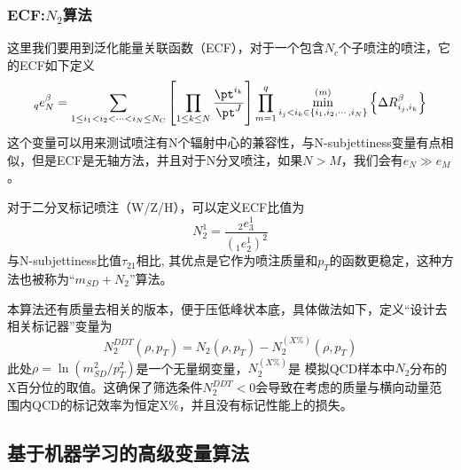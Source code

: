 \subsubsection{ECF:$N_2$算法}
这里我们要用到泛化能量关联函数（ECF），对于一个包含$N_c$个子喷注的喷注，它的ECF如下定义
\begin{equation}
    {}_{q}e_{N}^{\beta}=\sum_{1\leq i_{1}<i_{2}<\cdots<i_{N}\leq N_{\text{C}}}%
\left[\prod_{1\leq k\leq N}\frac{\pt^{i_{k}}}{\pt^{J}}\right]\prod_{m=1}^{q}%
\min_{i_{j}<i_{k}\in\{i_{1},i_{2},\cdots,i_{N}\}}^{(m)}\left\{\Delta R_{i_{j},%
i_{k}}^{\beta}\right\}
\end{equation}
这个变量可以用来测试喷注有N个辐射中心的兼容性，与N-subjettiness变量有点相似，但是ECF是无轴方法，并且对于N分叉喷注，如果$N>M$，我们会有$e_N\gg e_M$。

对于二分叉标记喷注（W/Z/H），可以定义ECF比值为
\begin{equation}
    N_{2}^{1}=\frac{{}_{2}e_{3}^{1}}{(_{1}e_{2}^{1})^{2}}
\end{equation}
与N-subjettiness比值$\tau_{21}$相比, 其优点是它作为喷注质量和$p_T$的函数更稳定，这种方法也被称为“$m_{SD}+N_2$”算法。

本算法还有质量去相关的版本，便于压低峰状本底，具体做法如下，定义“设计去相关标记器”变量为
\begin{equation}
    N_2^{DDT}(\rho,p_T)=N_2(\rho, p_T)-N_2^{(X\%)}(\rho,p_T)
\end{equation}
此处$\rho=\ln{(m_{SD}^2/p_T^2)}$是一个无量纲变量，$N_2^{(X\%)}$是
模拟QCD样本中$N_2$分布的X百分位的取值。这确保了筛选条件$N^{DDT}_2<0$会导致在考虑的质量与横向动量范围内QCD的标记效率为恒定X\%，并且没有标记性能上的损失。

\subsection{基于机器学习的高级变量算法}
